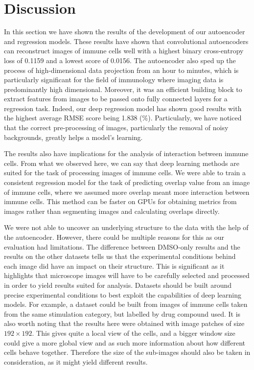 \section{Discussion}

In this section we have shown the results of the development of our autoencoder and regression models. These results have shown that convolutional autoencoders can reconstruct images of immune cells well with a highest binary cross-entropy loss of 0.1159 and a lowest score of 0.0156. The autoencoder also sped up the process of high-dimensional data projection from an hour to minutes, which is particularly significant for the field of immunology where imaging data is predominantly high dimensional. Moreover, it was an efficient building block to extract features from images to be passed onto fully connected layers for a regression task. Indeed, our deep regression model has shown good results with the highest average RMSE score being 1.838 (\%). Particularly, we have noticed that the correct pre-processing of images, particularly the removal of noisy backgrounds, greatly helps a model's learning.

The results also have implications for the analysis of interaction between immune cells. From what we observed here, we can say that deep learning methods are suited for the task of processing images of immune cells. We were able to train a consistent regression model for the task of predicting overlap value from an image of immune cells, where we assumed more overlap meant more interaction between immune cells. This method can be faster on GPUs for obtaining metrics from images rather than segmenting images and calculating overlaps directly.

We were not able to uncover an underlying structure to the data with the help of the autoencoder. However, there could be multiple reasons for this as our evaluation had limitations. The difference between DMSO-only results and the results on the other datasets tells us that the experimental conditions behind each image did have an impact on their structure. This is significant as it highlights that microscope images will have to be carefully selected and processed in order to yield results suited for analysis. Datasets should be built around precise experimental conditions to best exploit the capabilities of deep learning models. For example, a dataset could be built from images of immune cells taken from the same stimulation category, but labelled by drug compound used. It is also worth noting that the results here were obtained with image patches of size $192\times192$. This gives quite a local view of the cells, and a bigger window size could give a more global view and as such more information about how different cells behave together. Therefore the size of the sub-images should also be taken in consideration, as it might yield different results. 

